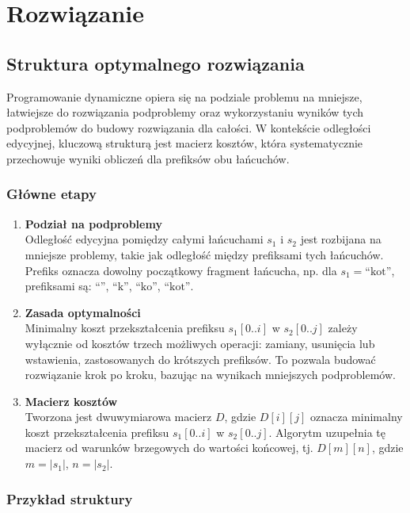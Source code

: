 \section{Rozwiązanie}
\subsection{Struktura optymalnego rozwiązania}
Programowanie dynamiczne opiera się na podziale problemu na mniejsze, łatwiejsze do rozwiązania podproblemy oraz wykorzystaniu wyników tych podproblemów do budowy rozwiązania dla całości. W kontekście odległości edycyjnej, kluczową strukturą jest macierz kosztów, która systematycznie przechowuje wyniki obliczeń dla prefiksów obu łańcuchów.

\subsubsection{Główne etapy}

\begin{enumerate}
    \item \textbf{Podział na podproblemy} \\
    Odległość edycyjna pomiędzy całymi łańcuchami $s_1$ i $s_2$ jest rozbijana na mniejsze problemy, takie jak odległość między prefiksami tych łańcuchów. Prefiks oznacza dowolny początkowy fragment łańcucha, np. dla $s_1 = \text{``kot''}$, prefiksami są: $\text{``''}$, $\text{``k''}$, $\text{``ko''}$, $\text{``kot''}$.
    
    \item \textbf{Zasada optymalności} \\
    Minimalny koszt przekształcenia prefiksu $s_1[0..i]$ w $s_2[0..j]$ zależy wyłącznie od kosztów trzech możliwych operacji: zamiany, usunięcia lub wstawienia, zastosowanych do krótszych prefiksów. To pozwala budować rozwiązanie krok po kroku, bazując na wynikach mniejszych podproblemów.

    \item \textbf{Macierz kosztów} \\
    Tworzona jest dwuwymiarowa macierz $D$, gdzie $D[i][j]$ oznacza minimalny koszt przekształcenia prefiksu $s_1[0..i]$ w $s_2[0..j]$. Algorytm uzupełnia tę macierz od warunków brzegowych do wartości końcowej, tj. $D[m][n]$, gdzie $m = |s_1|$, $n = |s_2|$.
\end{enumerate}

\subsubsection{Przykład struktury}

